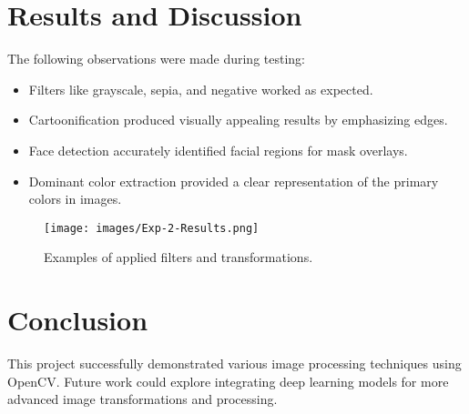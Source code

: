 \documentclass{report}
\begin{document}
\section{Results and Discussion}
The following observations were made during testing:
\begin{itemize}
    \item Filters like grayscale, sepia, and negative worked as expected.
    \item Cartoonification produced visually appealing results by emphasizing edges.
    \item Face detection accurately identified facial regions for mask overlays.
    \item Dominant color extraction provided a clear representation of the primary colors in images.
\end{itemize}

\begin{figure}[h!]
    \centering
    \texttt{[image: images/Exp-2-Results.png]} %
    \caption{Examples of applied filters and transformations.}
    \label{fig:output}
\end{figure}

\section{Conclusion}
This project successfully demonstrated various image processing techniques using OpenCV. Future work could explore integrating deep learning models for more advanced image transformations and processing.
\end{document}
